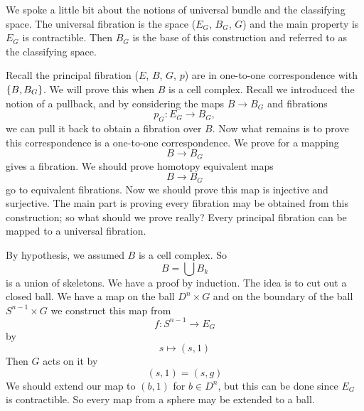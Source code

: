 
We spoke a little bit about the notions of universal bundle and
the classifying space. The universal fibration is the space
($E_{G}$, $B_{G}$, $G$) and the main property is $E_{G}$ is
contractible. Then $B_{G}$ is the base of this construction and
referred to as the classifying space.

Recall the principal fibration ($E$, $B$, $G$, $p$) are in
one-to-one correspondence with $\homotopyClass(B,B_{G})$. We will
prove this when $B$ is a cell complex. Recall we introduced the
notion of a pullback, and by considering the maps
$B\to B_{G}$ and fibrations
\begin{equation}
p_{G}\colon E_{G}\to B_{G},
\end{equation}
we can pull it back to obtain a fibration over $B$. Now what
remains is to prove this correspondence is a one-to-one
correspondence. We prove for a mapping
\begin{equation}
B\to B_{G}
\end{equation}
gives a fibration. We should prove homotopy equivalent maps
\begin{equation}
B\to B_{G}
\end{equation}
go to equivalent fibrations. Now we should prove this map is
injective and surjective. The main part is proving every
fibration may be obtained from this construction; so what should
we prove really? Every principal fibration can be mapped to a
universal fibration.

By hypothesis, we assumed $B$ is a cell complex. So 
\begin{equation}
B=\bigcup B_{k}
\end{equation}
is a union of skeletons. We have a proof by induction. The idea
is to cut out a closed ball. We have a map on the ball
$D^{n}\times G$ and on the boundary of the ball $S^{n-1}\times G$
we construct this map from
\begin{equation}
f\colon S^{n-1}\to E_{G}
\end{equation}
by
\begin{equation}
s\mapsto (s,1)
\end{equation}
Then $G$ acts on it by
\begin{equation}
(s,1)=(s,g)
\end{equation}
We should extend our map to $(b,1)$ for $b\in D^{n}$, but this
can be done since $E_{G}$ is contractible. So every map from a
sphere may be extended to a ball.

